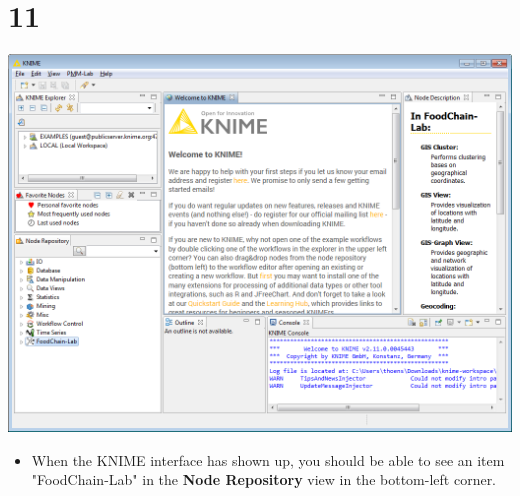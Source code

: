 \documentclass{beamer}
\begin{document}
\section{11}
\begin{frame}
	\begin{center}
  		\includegraphics[height=0.6\textheight]{11.png}
	\end{center}
	\begin{itemize}
		\item When the KNIME interface has shown up, you should be able to see an item "FoodChain-Lab" in the \textbf{Node Repository} view in the bottom-left corner.
	\end{itemize}
\end{frame}
\end{document}
